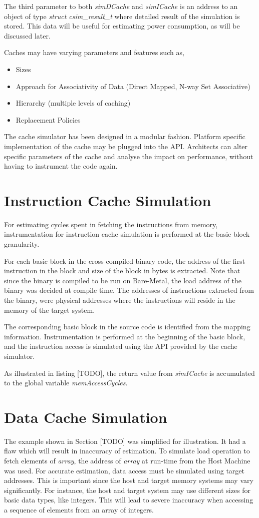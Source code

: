 The third parameter to both \emph{simDCache} and \emph{simICache} is an address to an object of type \emph{struct csim\_result\_t} where detailed result of the simulation is stored. This data will be useful for estimating power consumption, as will be discussed later.

Caches may have varying parameters and features such as,
\begin{itemize} \itemsep -6pt
\item Sizes
\item Approach for Associativity of Data (Direct Mapped, N-way Set Associative)
\item Hierarchy (multiple levels of caching)
\item Replacement Policies
\end{itemize}

The cache simulator has been designed in a modular fashion. Platform specific implementation of the cache may be plugged into the API. Architects can alter specific parameters of the cache and analyse the impact on performance, without having to instrument the code again.

\section{Instruction Cache Simulation}
For estimating cycles spent in fetching the instructions from memory, instrumentation for instruction cache simulation is performed at the basic block granularity. 

For each basic block in the cross-compiled binary code, the address of the first instruction in the block and size of the block in bytes is extracted. Note that since the binary is compiled to be run on Bare-Metal, the load address of the binary was decided at compile time. The addresses of instructions extracted from the binary, were physical addresses where the instructions will reside in the memory of the target system.

The corresponding basic block in the source code is identified from the mapping information. Instrumentation is performed at the beginning of the basic block, and the instruction access is simulated using the API provided by the cache simulator.

As illustrated in listing [TODO], the return value from \emph{simICache} is accumulated to the global variable \emph{memAccessCycles}.

\section{Data Cache Simulation}
The example shown in Section [TODO] was simplified for illustration. It had a flaw which will result in inaccuracy of estimation. To simulate load operation to fetch elements of \emph{array}, the address of \emph{array} at run-time from the Host Machine was used. For accurate estimation, data access must be simulated using target addresses. This is important since the host and target memory systems may vary significantly. For instance, the host and target system may use different sizes for basic data types, like integers. This will lead to severe inaccuracy when accessing a sequence of elements from an array of integers. 

